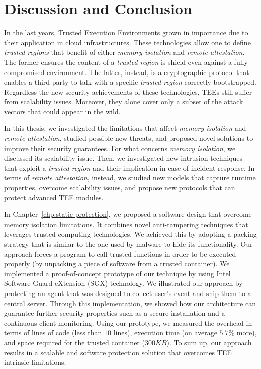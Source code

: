 \chapter{Discussion and Conclusion}
\label{chp:conclusion}

In the last years, Trusted Execution Environments grown in importance due to 
their application in cloud infrastructures.
These technologies allow one to define \emph{trusted regions} that benefit of 
either \emph{memory isolation} and \emph{remote attestation}.
The former ensures the content of a \emph{trusted region} is shield even 
against a fully compromised environment.
The latter, instead, is a cryptographic protocol that enables a third party to 
talk with a specific \emph{trusted region} correctly bootstrapped.
Regardless the new security achievements of these technologies, TEEs still 
suffer from scalability issues. 
Moreover, they alone cover only a subset of the attack vectors that could 
appear in the wild.
		
In this thesis, we investigated the limitations that affect \emph{memory 
isolation} and \emph{remote attestation}, studied possible new threats, and 
proposed novel solutions to improve their security guarantees.
For what concerns \emph{memory isolation}, we discussed its 
scalability issue. Then, we investigated new intrusion techniques that exploit 
a \emph{trusted region} and their implication in case of incident response.
In terms of \emph{remote attestation}, instead, we studied new models that 
capture runtime properties, overcome scalability issues, and propose new 
protocols that can protect advanced TEE modules.


In Chapter~\ref{chp:static-protection}, we proposed a software design that 
overcome memory isolation limitations. It combines novel anti-tampering 
techniques that leverages trusted computing technologies.
We achieved this by adopting a packing strategy that is similar to the one used 
by malware to hide its functionality.
Our approach forces a program to call trusted functions in order to be executed 
properly (by unpacking a piece of software from a trusted container). 
We implemented a proof-of-concept prototype of our technique by using Intel 
Software Guard eXtension (SGX) technology.
We illustrated our approach by protecting an agent that was designed to collect 
user's event and ship them to a central server.
Through this implementation, we showed how our architecture can guarantee 
further security properties such as a secure installation and a continuous 
client monitoring. Using our prototype, we measured the overhead in terms of 
lines of code (less than $10$ lines), execution time (on average $5.7\%$ more), 
and space required for the trusted container ($300KB$).
To sum up, our approach results in a scalable and software protection solution 
that overcomes TEE intrinsic limitations.

